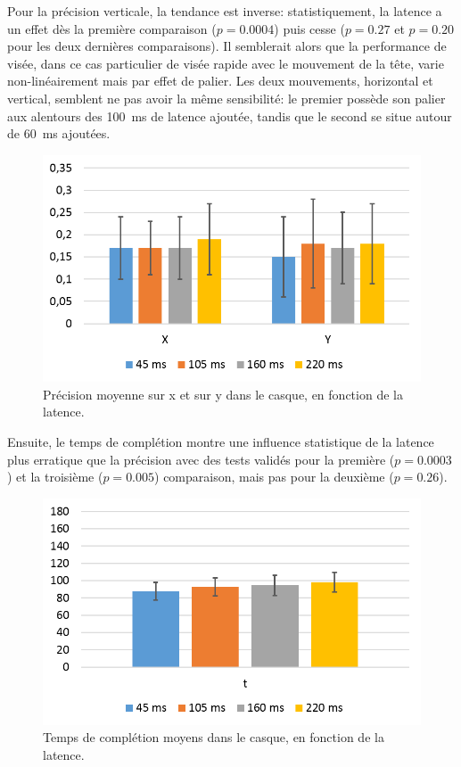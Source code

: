 	\par Pour la précision verticale, la tendance est inverse: statistiquement, la latence a un effet dès la première comparaison ($p = 0.0004$) puis cesse ($p = 0.27$ et $p = 0.20$ pour les deux dernières comparaisons). Il semblerait alors que la performance de visée, dans ce cas particulier de visée rapide avec le mouvement de la tête, varie non-linéairement mais par effet de palier. Les deux mouvements, horizontal et vertical, semblent ne pas avoir la même sensibilité: le premier possède son palier aux alentours des 100~ms de latence ajoutée, tandis que le second se situe autour de 60~ms ajoutées.
	
	\begin{figure}
		\centering
		\includegraphics[width=0.8\linewidth]{Figures/CasquePrecisionResults.png}
		\caption{Précision moyenne sur x et sur y dans le casque, en fonction de la latence.}
		\label{fig:casque_precision}
	\end{figure}
	
	\par Ensuite, le temps de complétion montre une influence statistique de la latence plus erratique que la précision avec des tests validés pour la première ($p = 0.0003$) et la troisième ($p = 0.005$) comparaison, mais pas pour la deuxième ($p = 0.26$).
	
	\begin{figure}
		\centering
		\includegraphics[width=0.8\linewidth]{Figures/CasqueCompletionTimeResults.png}
		\caption{Temps de complétion moyens dans le casque, en fonction de la latence.}
		\label{fig:casque_completion_time}
	\end{figure}
	
